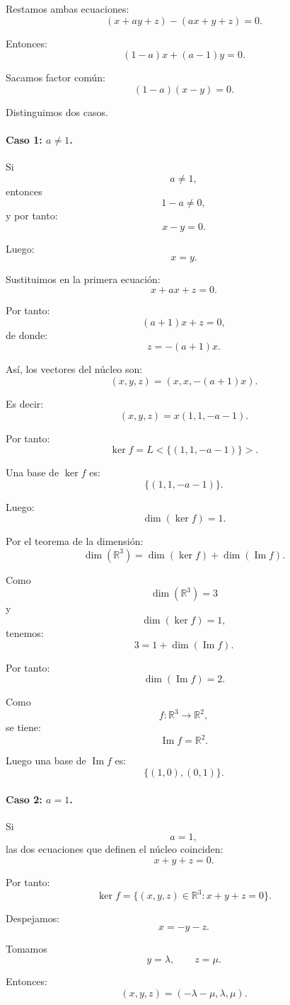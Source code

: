 \documentclass[12pt]{article}
\begin{document}
Restamos ambas ecuaciones:
\[
(x+ay+z)-(ax+y+z)=0.
\]

Entonces:
\[
(1-a)x+(a-1)y=0.
\]

Sacamos factor común:
\[
(1-a)(x-y)=0.
\]

Distinguimos dos casos.

\paragraph{Caso 1: \(a\neq 1\).}

Si
\[
a\neq 1,
\]
entonces
\[
1-a\neq 0,
\]
y por tanto:
\[
x-y=0.
\]

Luego:
\[
x=y.
\]

Sustituimos en la primera ecuación:
\[
x+ax+z=0.
\]

Por tanto:
\[
(a+1)x+z=0,
\]
de donde:
\[
z=-(a+1)x.
\]

Así, los vectores del núcleo son:
\[
(x,y,z)=(x,x,-(a+1)x).
\]

Es decir:
\[
(x,y,z)=x(1,1,-a-1).
\]

Por tanto:
\[
\ker f=L<\{(1,1,-a-1)\}>.
\]

Una base de \(\ker f\) es:
\[
\boxed{\{(1,1,-a-1)\}.}
\]

Luego:
\[
\boxed{\dim(\ker f)=1.}
\]

Por el teorema de la dimensión:
\[
\dim(\mathbb{R}^3)=\dim(\ker f)+\dim(\operatorname{Im} f).
\]

Como
\[
\dim(\mathbb{R}^3)=3
\]
y
\[
\dim(\ker f)=1,
\]
tenemos:
\[
3=1+\dim(\operatorname{Im} f).
\]

Por tanto:
\[
\dim(\operatorname{Im} f)=2.
\]

Como
\[
f:\mathbb{R}^3\longrightarrow \mathbb{R}^2,
\]
se tiene:
\[
\operatorname{Im} f=\mathbb{R}^2.
\]

Luego una base de \(\operatorname{Im} f\) es:
\[
\boxed{\{(1,0),(0,1)\}.}
\]

\paragraph{Caso 2: \(a=1\).}

Si
\[
a=1,
\]
las dos ecuaciones que definen el núcleo coinciden:
\[
x+y+z=0.
\]

Por tanto:
\[
\ker f=\{(x,y,z)\in\mathbb{R}^3:x+y+z=0\}.
\]

Despejamos:
\[
x=-y-z.
\]

Tomamos
\[
y=\lambda,
\qquad
z=\mu.
\]

Entonces:
\[
(x,y,z)=(-\lambda-\mu,\lambda,\mu).
\]
\end{document}
